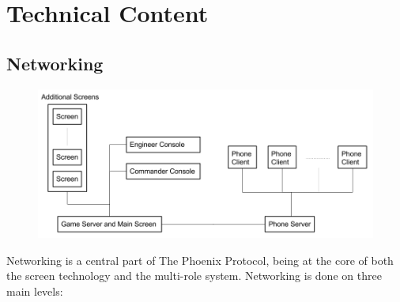 \documentclass[a4paper,11pt]{article}
\begin{document}

\clearpage

\section{Technical Content}
\subsection{Networking}

\begin{figure}[ht]
	\centering
	\includegraphics[width=\textwidth]{images/network_diagram}
    \label{fig:network_diagram}
\end{figure}

Networking is a central part of The Phoenix Protocol, being at the core of both the screen technology and the multi-role system. Networking is done on three main levels:
\end{document}
